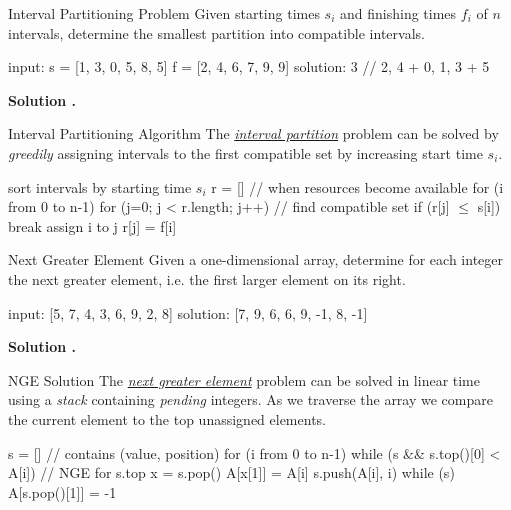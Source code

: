 \documentclass{cognito}
\begin{document}
\begin{note}{Interval Partitioning Problem}
	Given starting times $s_i$ and finishing times $f_i$ of $n$ intervals,
	determine the smallest partition into compatible intervals.
	\begin{largecode}
 input: s = [1, 3, 0, 5, 8, 5]
        f = [2, 4, 6, 7, 9, 9]
 solution: 3  // {2, 4} + {0, 1, 3} + {5}
	\end{largecode}
	\bf Solution \hyperref[note:Interval Partitioning Algorithm]{\solutionref}.
\end{note}

\begin{note}{Interval Partitioning Algorithm}
	The \hyperref[note:Interval Partitioning Problem]{\it interval partition} problem can be solved by \emph{greedily}
	assigning intervals to the first compatible set by increasing start time $s_i$.
	
	\begin{largecode}
 sort intervals by starting time $s_i$
 r = []  // when resources become available
 for (i from 0 to n-1)
	for (j=0; j < r.length; j++)  // find compatible set
		if (r[j] $\leq$ s[i]) break
	assign i to j
	r[j] = f[i]
	\end{largecode}
	\vspace{-5pt}
\end{note}

\begin{note}{Next Greater Element}
	Given a one-dimensional array, determine for each integer
	the next greater element, i.e. the first larger element on its right.
	
	\begin{largecode}
 input:    [5, 7, 4, 3, 6,  9, 2,  8]
 solution: [7, 9, 6, 6, 9, -1, 8, -1]
	\end{largecode}
	\bf Solution \hyperref[note:NGE Solution]{\solutionref}.
\end{note}

\begin{note}{NGE Solution}
	The \hyperref[note:Next Greater Element]{\it next greater element} problem can be solved in linear time using a \emph{stack}
	containing \emph{pending} integers. As we traverse the array we compare the current element
	to the top unassigned elements.
	\begin{largecode}
 s = []  // contains (value, position)
 for (i from 0 to n-1)
 	while (s && s.top()[0] < A[i])  // NGE for s.top
		x = s.pop()
		A[x[1]] = A[i]
	s.push(A[i], i)
while (s) A[s.pop()[1]] = -1
	\end{largecode}
	\vspace{-5pt}
\end{note}
\end{document}
